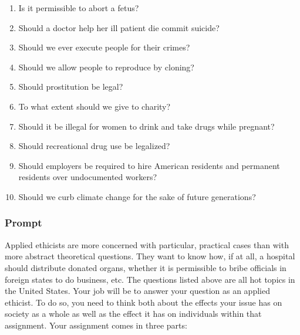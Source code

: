 \documentclass[]{article}
\begin{document}
\begin{enumerate}
\def\labelenumi{\arabic{enumi}.}
\item
  Is it permissible to abort a fetus?
\item
  Should a doctor help her ill patient die commit suicide?
\item
  Should we ever execute people for their crimes?
\item
  Should we allow people to reproduce by cloning?
\item
  Should prostitution be legal?
\item
  To what extent should we give to charity?
\item
  Should it be illegal for women to drink and take drugs while pregnant?
\item
  Should recreational drug use be legalized?
\item
  Should employers be required to hire American residents and permanent
  residents over undocumented workers?
\item
  Should we curb climate change for the sake of future generations?
\end{enumerate}

\subsubsection{Prompt}\label{prompt}

Applied ethicists are more concerned with particular, practical cases
than with more abstract theoretical questions. They want to know how, if
at all, a hospital should distribute donated organs, whether it is
permissible to bribe officials in foreign states to do business, etc.
The questions listed above are all hot topics in the United States. Your
job will be to answer your question as an applied ethicist. To do so,
you need to think both about the effects your issue has on society as a
whole as well as the effect it has on individuals within that
assignment. Your assignment comes in three parts:
\end{document}
